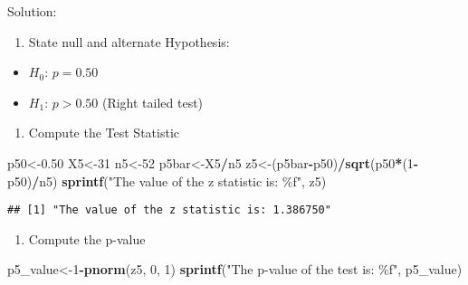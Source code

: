 \documentclass[
]{article}
\newenvironment{Shaded}{\begin{snugshade}}{\end{snugshade}}
\newcommand{\DecValTok}[1]{\textcolor[rgb]{0.00,0.00,0.81}{#1}}
\newcommand{\FloatTok}[1]{\textcolor[rgb]{0.00,0.00,0.81}{#1}}
\newcommand{\FunctionTok}[1]{\textcolor[rgb]{0.13,0.29,0.53}{\textbf{#1}}}
\newcommand{\NormalTok}[1]{#1}
\newcommand{\OtherTok}[1]{\textcolor[rgb]{0.56,0.35,0.01}{#1}}
\newcommand{\SpecialCharTok}[1]{\textcolor[rgb]{0.81,0.36,0.00}{\textbf{#1}}}
\newcommand{\StringTok}[1]{\textcolor[rgb]{0.31,0.60,0.02}{#1}}
\providecommand{\tightlist}{%
  \setlength{\itemsep}{0pt}\setlength{\parskip}{0pt}}
\begin{document}
Solution:

\begin{enumerate}
\def\labelenumi{\arabic{enumi}.}
\tightlist
\item
  State null and alternate Hypothesis:
\end{enumerate}

\begin{itemize}
\tightlist
\item
  \(H_{0}\): \(p=0.50\)
\item
  \(H_{1}\): \(p>0.50\) (Right tailed test)
\end{itemize}

\begin{enumerate}
\def\labelenumi{\arabic{enumi}.}
\setcounter{enumi}{1}
\tightlist
\item
  Compute the Test Statistic
\end{enumerate}

\begin{Shaded}
\begin{Highlighting}[]
\NormalTok{p50}\OtherTok{\textless{}{-}}\FloatTok{0.50}
\NormalTok{X5}\OtherTok{\textless{}{-}}\DecValTok{31}
\NormalTok{n5}\OtherTok{\textless{}{-}}\DecValTok{52}
\NormalTok{p5bar}\OtherTok{\textless{}{-}}\NormalTok{X5}\SpecialCharTok{/}\NormalTok{n5}
\NormalTok{z5}\OtherTok{\textless{}{-}}\NormalTok{(p5bar}\SpecialCharTok{{-}}\NormalTok{p50)}\SpecialCharTok{/}\FunctionTok{sqrt}\NormalTok{(p50}\SpecialCharTok{*}\NormalTok{(}\DecValTok{1}\SpecialCharTok{{-}}\NormalTok{p50)}\SpecialCharTok{/}\NormalTok{n5)}
\FunctionTok{sprintf}\NormalTok{(}\StringTok{"The value of the z statistic is: \%f"}\NormalTok{, z5)}
\end{Highlighting}
\end{Shaded}

\begin{verbatim}
## [1] "The value of the z statistic is: 1.386750"
\end{verbatim}

\begin{enumerate}
\def\labelenumi{\arabic{enumi}.}
\setcounter{enumi}{2}
\tightlist
\item
  Compute the p-value
\end{enumerate}

\begin{Shaded}
\begin{Highlighting}[]
\NormalTok{p5\_value}\OtherTok{\textless{}{-}}\DecValTok{1}\SpecialCharTok{{-}}\FunctionTok{pnorm}\NormalTok{(z5, }\DecValTok{0}\NormalTok{, }\DecValTok{1}\NormalTok{)}
\FunctionTok{sprintf}\NormalTok{(}\StringTok{"The p{-}value of the test is: \%f"}\NormalTok{, p5\_value)}
\end{Highlighting}
\end{Shaded}
\end{document}
